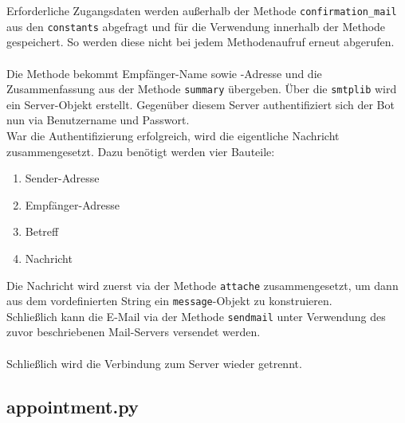                 Erforderliche Zugangsdaten werden außerhalb der Methode \verb|confirmation_mail| aus den \verb|constants| abgefragt und für die Verwendung innerhalb der Methode gespeichert. So werden diese nicht bei jedem Methodenaufruf erneut abgerufen.\\
                \\
                Die Methode bekommt Empfänger-Name sowie -Adresse und die Zusammenfassung aus der Methode \verb|summary| übergeben. Über die \verb|smtplib| wird ein Server-Objekt erstellt. Gegenüber diesem Server authentifiziert sich der Bot nun via Benutzername und Passwort.\\
                War die Authentifizierung erfolgreich, wird die eigentliche Nachricht zusammengesetzt. Dazu benötigt werden vier Bauteile: 
                \begin{enumerate}
                    \item Sender-Adresse
                    \item Empfänger-Adresse
                    \item Betreff
                    \item Nachricht
                \end{enumerate}
                Die Nachricht wird zuerst via der Methode \verb|attache| zusammengesetzt, um dann aus dem vordefinierten String ein \verb|message|-Objekt zu konstruieren.\\
                Schließlich kann die E-Mail via der Methode \verb|sendmail| unter Verwendung des zuvor beschriebenen Mail-Servers versendet werden.\\
                \\
                Schließlich wird die Verbindung zum Server wieder getrennt.


        \subsection{appointment.py} \label{appointment.py}

